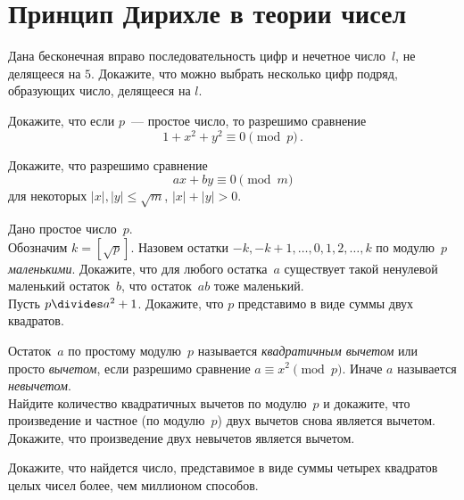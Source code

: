 
\section*{Принцип Дирихле в теории чисел}


\begin{problems}

\item
Дана бесконечная вправо последовательность цифр и нечетное число~$l$,
не делящееся на $5$.
Докажите, что можно выбрать несколько цифр подряд, образующих число, делящееся
на $l$.

\item
Докажите, что если $p$~— простое число, то разрешимо сравнение
\[
    1 + x^2 + y^2 \equiv 0 \pmod{p}
\, . \]

\item
Докажите, что разрешимо сравнение
\[
    a x + b y \equiv 0 \pmod{m}
\]
для некоторых $\lvert x \rvert, \lvert y \rvert \leq \sqrt{m}$,
$\lvert x \rvert + \lvert y \rvert > 0$.

\item
Дано простое число~$p$.
\\
\subproblem
Обозначим $k = \left[ \sqrt{p} \right]$.
Назовем остатки $- k, - k + 1, \ldots, 0, 1, 2, \ldots, k$ по модулю~$p$
\emph{маленькими}.
Докажите, что для любого остатка~$a$ существует такой ненулевой маленький
остаток~$b$, что остаток~$a b$ тоже маленький.
\\
\subproblem
Пусть $p \divides a^2 + 1$.
Докажите, что $p$ представимо в виде суммы двух квадратов.


\item
Остаток~$a$ по простому модулю~$p$ называется \emph{квадратичным вычетом} или
просто \emph{вычетом}, если разрешимо сравнение $a \equiv x^2 \pmod{p}$.
Иначе $a$ называется \emph{невычетом}.
\\
\subproblem
Найдите количество квадратичных вычетов по модулю~$p$ и докажите, что
произведение и частное (по модулю~$p$) двух вычетов снова является вычетом.
\\
\subproblem
Докажите, что произведение двух невычетов является вычетом.

\item
Докажите, что найдется число, представимое в виде суммы четырех квадратов целых
чисел более, чем миллионом способов.

\end{problems}

